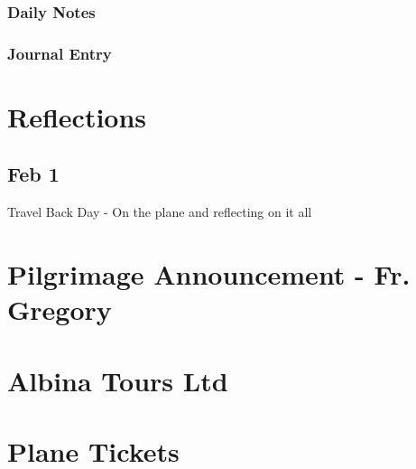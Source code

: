 \documentclass[letterpaper]{report}
\begin{document}
\clearpage
\subsection{Daily Notes}

\clearpage
\subsection{Journal Entry}

\chapter{Reflections}
\section{Feb 1}
Travel Back Day - On the plane and reflecting on it all

\begin{appendix}
	\chapter{Pilgrimage Announcement - Fr. Gregory}
	\clearpage
	
	\chapter{Albina Tours Ltd}
	\clearpage
	
	\chapter{Plane Tickets}
	\clearpage
	

\end{appendix}
\end{document}
